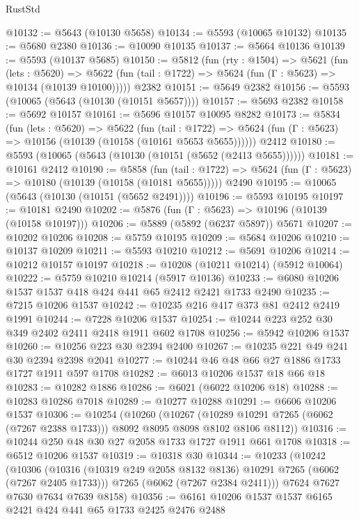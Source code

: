 \begin{lexlean}{RustStd}
\begin{coremodule}
@10132 := @5643 (@10130 @5658)
@10134 := @5593 (@10065 @10132)
@10135 := @5680 @2380
@10136 := @10090 @10135
@10137 := @5664 @10136
@10139 := @5593 (@10137 @5685)
@10150 := @5812
    (fun (rty : @1504) =>
    @5621
      (fun (lets : @5620) =>
      @5622 (fun (tail : @1722) => @5624 (fun (Γ : @5623) => @10134 (@10139 @10100)))))
    @2382
@10151 := @5649 @2382
@10156 := @5593 (@10065 (@5643 (@10130 (@10151 @5657))))
@10157 := @5693 @2382
@10158 := @5692 @10157
@10161 := @5696 @10157 @10095 @8282
@10173 := @5834
    (fun (lets : @5620) =>
    @5622
      (fun (tail : @1722) =>
      @5624 (fun (Γ : @5623) => @10156 (@10139 (@10158 (@10161 @5653 @5655))))))
    @2412
@10180 := @5593 (@10065 (@5643 (@10130 (@10151 (@5652 (@2413 @5655))))))
@10181 := @10161 @2412
@10190 := @5858
    (fun (tail : @1722) => @5624 (fun (Γ : @5623) => @10180 (@10139 (@10158 (@10181 @5655)))))
    @2490
@10195 := @10065 (@5643 (@10130 (@10151 (@5652 @2491))))
@10196 := @5593 @10195
@10197 := @10181 @2490
@10202 := @5876 (fun (Γ : @5623) => @10196 (@10139 (@10158 @10197)))
@10206 := @5889 (@5892 (@6237 @5897)) @5671
@10207 := @10202 @10206
@10208 := @5759 @10195
@10209 := @5684 @10206
@10210 := @10137 @10209
@10211 := @5593 @10210
@10212 := @5691 @10206
@10214 := @10212 @10157 @10197
@10218 := @10208 (@10211 @10214) (@5912 @10064)
@10222 := @5759 @10210 @10214 (@5917 @10136)
@10233 := @6080 @10206 @1537 @1537 @418 @424 @441 @65 @2412 @2421 @1733 @2490
@10235 := @7215 @10206 @1537
@10242 := @10235 @216 @417 @373 @81 @2412 @2419 @1991
@10244 := @7228 @10206 @1537
@10254 := @10244 @223 @252 @30 @349 @2402 @2411 @2418 @1911 @602 @1708
@10256 := @5942 @10206 @1537
@10260 := @10256 @223 @30 @2394 @2400
@10267 := @10235 @221 @49 @241 @30 @2394 @2398 @2041
@10277 := @10244 @46 @48 @66 @27 @1886 @1733 @1727 @1911 @597 @1708
@10282 := @6013 @10206 @1537 @18 @66 @18
@10283 := @10282 @1886
@10286 := @6021 (@6022 @10206 @18)
@10288 := @10283 @10286 @7018
@10289 := @10277 @10288
@10291 := @6606 @10206 @1537
@10306 := @10254
    (@10260
      (@10267
        (@10289 @10291 @7265 (@6062 (@7267 @2388 @1733)))
        @8092
        @8095
        @8098
        @8102
        @8106
        @8112))
@10316 := @10244 @250 @48 @30 @27 @2058 @1733 @1727 @1911 @661 @1708
@10318 := @6512 @10206 @1537
@10319 := @10318 @30
@10344 := @10233
    (@10242
      (@10306
        (@10316 (@10319 @249 @2058 @8132 @8136) @10291 @7265 (@6062 (@7267 @2405 @1733)))
        @7265
        (@6062 (@7267 @2384 @2411)))
      @7624
      @7627
      @7630
      @7634
      @7639
      @8158)
@10356 := @6161 @10206 @1537 @1537 @6165 @2421 @424 @441 @65 @1733 @2425 @2476 @2488

\end{coremodule}
\end{lexlean}
